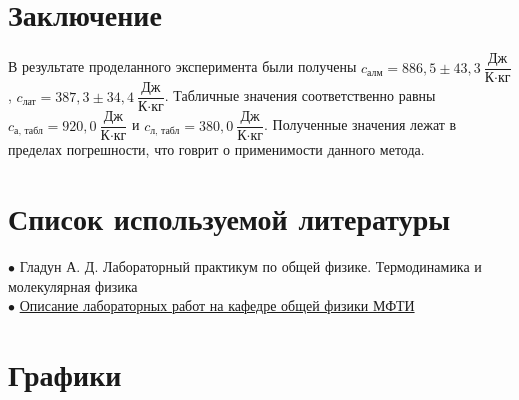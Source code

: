 \section{Заключение}
В результате проделанного эксперимента были получены $c_{\text{алм}} = 886,5 \pm 43,3~\dfrac{\text{Дж}}{\text{К} \cdot \text{кг}}$, $c_{\text{лат}} = 387,3 \pm 34,4~\dfrac{\text{Дж}}{\text{К} \cdot \text{кг}}$. Табличные значения соответственно равны $c_{\text{а, табл}} = 920,0~\dfrac{\text{Дж}}{\text{К} \cdot \text{кг}}$ и $c_{\text{л, табл}} = 380,0~\dfrac{\text{Дж}}{\text{К} \cdot \text{кг}}$. Полученные значения лежат в пределах погрешности, что говрит о применимости данного метода.

\section{Список используемой литературы}

$\bullet$ Гладун А. Д. Лабораторный практикум по общей физике. Термодинамика и молекулярная физика\\

$\bullet$ \href{https://mipt.ru/education/chair/physics/S_II/lab/}{Описание лабораторных работ на кафедре общей физики МФТИ}

\newpage

\section{Графики}

\begin{figure}[h]
\end{figure}

\begin{figure}[h]
\end{figure}





